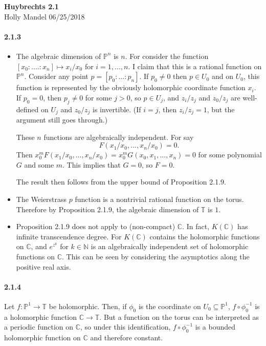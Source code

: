 \documentclass[10pt,letter]{article}
\begin{document}
\begin{center} 
{\bf Huybrechts 2.1} \\
Holly Mandel 06/25/2018
\end{center}

\paragraph*{2.1.3}
\begin{itemize}
\item The algebraic dimension of $\mathbb{P}^n$ is $n$. For consider the function $[x_0: .... : x_n] \mapsto x_i/x_0$ for $i = 1,...,n$. I claim that this is a rational function on $\mathbb{P}^n$. Consider any point $p = [p_0:...:p_n]$. If $p_0 \neq 0$ then $p \in U_0$ and on $U_0$, this function is represented by the obviously holomorphic coordinate function $x_i$. If $p_0 = 0$, then $p_j \neq 0$ for some $j > 0$, so $p \in U_j$, and $z_i/z_j$ and $z_0/z_j$ are well-defined on $U_j$ and $z_0/z_j$ is invertible. (If $i = j$, then $z_i/z_j = 1$, but the argument still goes through.) 

These $n$ functions are algebraically independent. For say \[ F(x_1/x_0,...,x_n/x_0) = 0.\] Then $x_0^m F(x_1/x_0,...,x_n/x_0) = x_0^m G(x_0,x_1,...,x_n) = 0$ for some polynomial $G$ and some $m$. This implies that $G = 0$, so $F = 0$. 

The result then follows from the upper bound of Proposition 2.1.9.
 
\item The Weierstrass $p$ function is a nontrivial rational function on the torus. Therefore by Proposition 2.1.9, the algebraic dimension of $\mathbb{T}$ is $1$. 

\item Proposition 2.1.9 does not apply to (non-compact) $\mathbb{C}$. In fact, $K(\mathbb{C})$ has infinite transcendence degree. For $K(\mathbb{C})$ contains the holomorphic functions on $\mathbb{C}$, and $e^{z^k}$ for $k \in \mathbb{N}$ is an algebraically independent set of holomorphic functions on $\mathbb{C}$. This can be seen by considering the asymptotics along the positive real axis. 
\end{itemize}
\paragraph*{2.1.4} Let $f: \mathbb{P}^1 \rightarrow \mathbb{T}$ be holomorphic. Then, if $\phi_0$ is the coordinate on $U_0 \subseteq \mathbb{P}^1$, $f \circ \phi_0^{-1}$ is a holomorphic function $\mathbb{C} \rightarrow \mathbb{T}$. But a function on the torus can be interpreted as a periodic function on $\mathbb{C}$, so under this identification, $f \circ \phi_0^{-1}$ is a bounded holomorphic function on $\mathbb{C}$ and therefore constant. 
\end{document}

